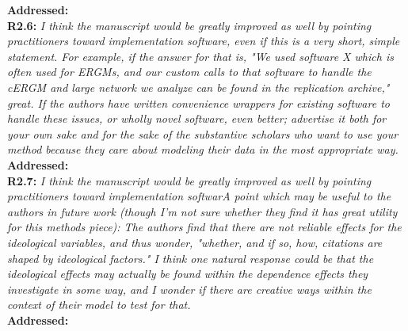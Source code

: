 \documentclass[a4paper,11pt]{texMemo}
\begin{document}
\noindent \textbf{Addressed:}  \\


\noindent \textbf{R2.6:} \emph{ I think the manuscript would be greatly improved as well by pointing practitioners toward implementation software, even if this is a very short, simple statement. For example, if the answer for that is, "We used software X which is often used for ERGMs, and our custom calls to that software to handle the cERGM and large network we analyze can be found in the replication archive," great. If the authors have written convenience wrappers for existing software to handle these issues, or wholly novel software, even better; advertise it both for your own sake and for the sake of the substantive scholars who want to use your method because they care about modeling their data in the most appropriate way.}\\

\noindent \textbf{Addressed:}  \\

\noindent \textbf{R2.7:} \emph{ I think the manuscript would be greatly improved as well by pointing practitioners toward implementation softwarA point which may be useful to the authors in future work (though I'm not sure whether they find it has great utility for this methods piece): The authors find that there are not reliable effects for the ideological variables, and thus wonder, "whether, and if so, how, citations are shaped by ideological factors." I think one natural response could be that the ideological effects may actually be found within the dependence effects they investigate in some way, and I wonder if there are creative ways within the context of their model to test for that.}\\

\noindent \textbf{Addressed:}  \\


\printbibliography
\end{document}
